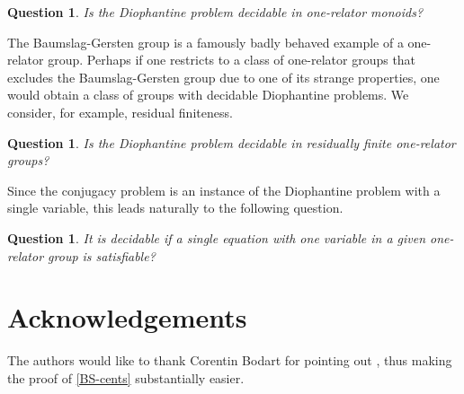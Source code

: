 \documentclass[11pt]{amsart}
\newtheorem{qu}[theorem]{Question}
\theoremstyle{definition}
\numberwithin{theorem}{section}
\begin{document}
\begin{qu}
	Is the Diophantine problem decidable in one-relator monoids?
\end{qu}

The Baumslag-Gersten group is a famously badly behaved example of a one-relator
group. Perhaps if one restricts to a class of one-relator groups that excludes
the Baumslag-Gersten group due to one of its strange properties, one would
obtain a class of groups with decidable Diophantine problems. We consider,
for example, residual finiteness.

\begin{qu}
	Is the Diophantine problem decidable in residually finite one-relator
	groups?
\end{qu}

Since the conjugacy problem is an instance of the Diophantine problem with a single variable, this leads naturally to the following question. 

\begin{qu}
	It is decidable if a single equation with one variable in
	a given one-relator group is satisfiable? 
\end{qu}

\section*{Acknowledgements}
The authors would like to thank Corentin Bodart for pointing out \cite{BS-fixed}, thus
making the proof of \cref{BS-cents} substantially easier.

 

\end{document}
